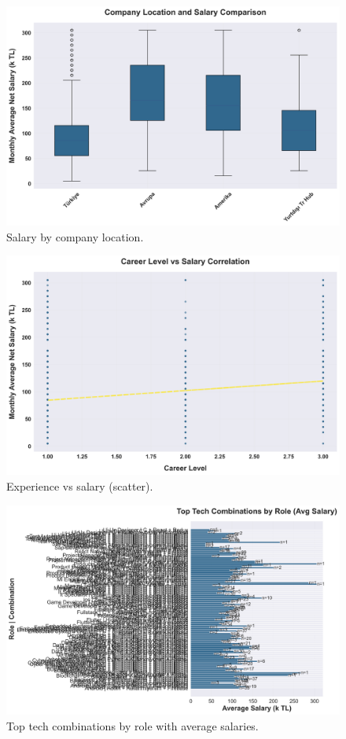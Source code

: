 \begin{figure}[H]
  \centering
  \includegraphics[width=0.85\linewidth]{figures/08_sirket_lokasyonu_maas_karsilastirma.png}
  \caption{Salary by company location.}
  \label{fig:location}
\end{figure}

\begin{figure}[H]
  \centering
  \includegraphics[width=0.85\linewidth]{figures/10_deneyim_maas_scatter.png}
  \caption{Experience vs salary (scatter).}
  \label{fig:experience}
\end{figure}

\begin{figure}[H]
  \centering
  \includegraphics[width=0.85\linewidth]{figures/21_tech_combo_top.png}
  \caption{Top tech combinations by role with average salaries.}
  \label{fig:tech-combos}
\end{figure}


